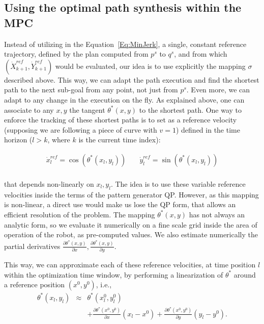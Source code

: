\subsection{Using the optimal path synthesis within the MPC}

Instead of utilizing in the Equation~\ref{Eq:MinJerk}, a single, constant reference trajectory, defined by the plan computed from $p^s$ to $q^s$, and from which $(\dot{X}_{k+1}^{ref},\dot{Y}_{k+1}^{ref})$ would be evaluated, our idea is to use explicitly the mapping $\sigma$ described above. This way, we can adapt the path execution and find the shortest path to the next sub-goal from any point, not just from $p^s$. Even more, we can adapt to any change in the execution on the fly. As explained above, one can  associate to any $x,y$ the tangent $\theta^*(x,y)$ to the shortest path. One way to enforce the tracking of these shortest paths is to set as a reference velocity (supposing we are following a piece of curve with $v=1$) defined in the time horizon ($l>k$, where $k$ is the current time index):

$$
\begin{array}{ccc}
\dot{x}^{ref}_l =  \cos(\theta^*(x_l,y_l)) & \; & \dot{y}^{ref}_l =  \sin(\theta^*(x_l,y_l)) \\
\end{array}
$$

\noindent that depends non-linearly on $x_l,y_l$. The idea is to use these variable reference velocities inside the terms of the pattern generator QP. However, as this mapping is non-linear, a direct use would make us lose the QP form, that allows an efficient resolution of the problem. The mapping $\theta^*(x,y)$ has not always an analytic form, so we evaluate it numerically on a fine scale grid inside the area of operation of the robot, as pre-computed values. We also estimate numerically the partial derivatives $\frac{\partial \theta^*(x,y)}{\partial x},  \frac{\partial \theta^*(x,y)}{\partial y}$.

This way, we can approximate each of these reference velocities, at time position $l$ within the optimization time window, by performing a linearization of $\theta^*$  around a reference position $(x^0,y^0)$, i.e.,
$$
\begin{array}{ccc}
\theta^*(x_l,y_l) & \approx & \theta^*(x^0_l,y^0_l)  \\
& & + \frac{\partial \theta^*(x^0,y^0)}{\partial x} (x_l-x^0) + \frac{\partial \theta^*(x^0,y^0)}{\partial y} (y_l-y^0).
\end{array}
$$

